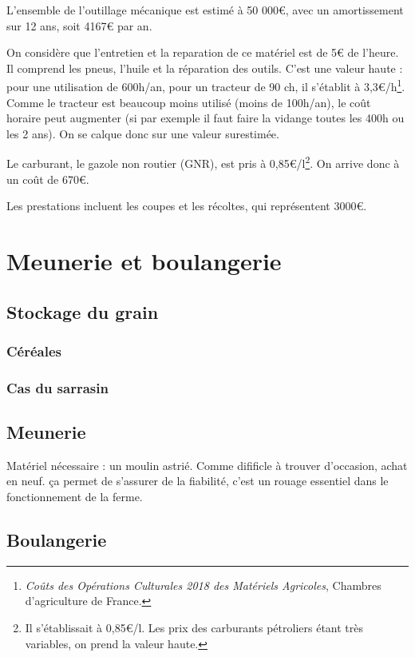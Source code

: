 \documentclass{book}
\begin{document}
L'ensemble de l'outillage mécanique est estimé à 50 000\euro{}, avec un amortissement sur 12 ans, soit 4167\euro{} par an.

On considère que l'entretien et la reparation de ce matériel est de 5\euro{} de l'heure. Il comprend les pneus, l'huile et la réparation des outils. C'est une valeur haute : pour une utilisation de 600h/an, pour un tracteur de 90 ch, il s'établit à 3,3\euro{}/h\footnote{\textit{Coûts des Opérations Culturales 2018 des Matériels Agricoles}, Chambres d'agriculture de France.}. Comme le tracteur est beaucoup moins utilisé (moins de 100h/an), le coût horaire peut augmenter (si par exemple il faut faire la vidange toutes les 400h ou les 2 ans). On se calque donc sur une valeur surestimée.

Le carburant, le gazole non routier (GNR), est pris à 0,85\euro{}/l\footnote{Il s'établissait à 0,85\euro{}/l. Les prix des carburants pétroliers étant très variables, on prend la valeur haute.}. On arrive donc à un coût de 670\euro{}.

Les prestations incluent les coupes et les récoltes, qui représentent 3000\euro{}.

\chapter{Meunerie et boulangerie}

\section{Stockage du grain}

\subsection{Céréales}

\subsection{Cas du sarrasin}

\section{Meunerie}

Matériel nécessaire : un moulin astrié. Comme difificle à trouver d'occasion, achat en neuf. ça permet de s'assurer de la fiabilité, c'est un rouage essentiel dans le fonctionnement de la ferme.

\section{Boulangerie}
\end{document}
